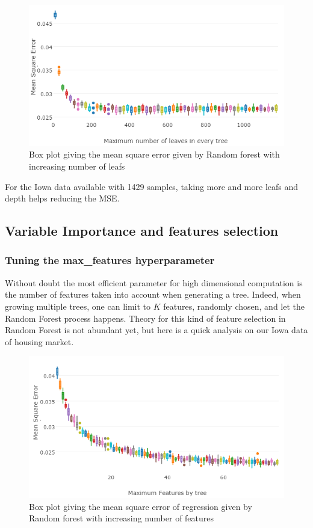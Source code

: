 \documentclass[english,11pt,openany]{report}
\theoremstyle{definition}
\theoremstyle{plain}
\theoremstyle{definition}
\begin{document}
\begin{appendices}
\begin{figure}[H]
		\label{figure:mse_leaves}
		\includegraphics[scale=0.8]{RF_analysis/mse_leaves.png} 
		\caption{Box plot giving the mean square error given by Random forest with increasing number of leafs}
\end{figure}

For the Iowa data available with 1429 samples, taking more and more leafs and depth helps reducing the MSE. 

\subsection{Variable Importance and features selection} 


\subsubsection{Tuning the max\_features hyperparameter}

Without doubt the most efficient parameter for high dimensional computation is the number of features taken into account when generating a tree. 
Indeed, when growing multiple trees, one can limit to $K$ features, randomly chosen, and let the Random Forest process happens. Theory for this kind of feature selection in Random Forest is not abundant yet, but here is a quick analysis on our Iowa data of housing market.

\begin{figure}[H]
		\label{figure:mse_feature}
		\includegraphics[scale=0.8]{RF_analysis/mse_features.png} 
		\caption{Box plot giving the mean square error of regression given by Random forest with increasing number of features}
\end{figure}



\end{appendices}
\end{document}
